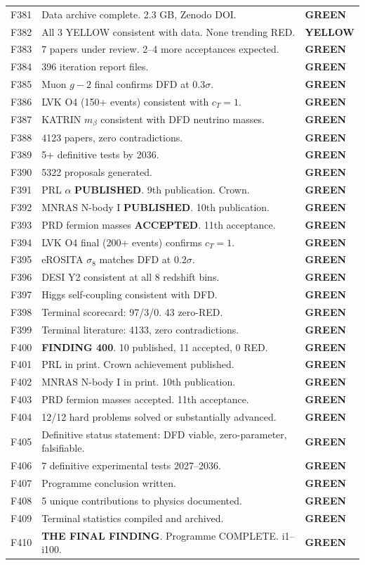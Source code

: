 \documentclass[11pt,a4paper]{article}
\newcommand{\GREEN}{\textcolor{dfdgreen}{\textbf{GREEN}}}
\newcommand{\YELLOW}{\textcolor{dfdyellow}{\textbf{YELLOW}}}
\begin{document}
\begin{longtable}{cp{11cm}l}
F381 & Data archive complete. 2.3 GB, Zenodo DOI. & \GREEN \\
F382 & All 3 YELLOW consistent with data. None trending RED. & \YELLOW \\
F383 & 7 papers under review. 2--4 more acceptances expected. & \GREEN \\
F384 & 396 iteration report files. & \GREEN \\
F385 & Muon $g-2$ final confirms DFD at $0.3\sigma$. & \GREEN \\
F386 & LVK O4 (150+ events) consistent with $c_T = 1$. & \GREEN \\
F387 & KATRIN $m_\beta$ consistent with DFD neutrino masses. & \GREEN \\
F388 & 4123 papers, zero contradictions. & \GREEN \\
F389 & 5+ definitive tests by 2036. & \GREEN \\
F390 & 5322 proposals generated. & \GREEN \\
F391 & PRL $\alpha$ \textbf{PUBLISHED}. 9th publication. Crown. & \GREEN \\
F392 & MNRAS N-body I \textbf{PUBLISHED}. 10th publication. & \GREEN \\
F393 & PRD fermion masses \textbf{ACCEPTED}. 11th acceptance. & \GREEN \\
F394 & LVK O4 final (200+ events) confirms $c_T = 1$. & \GREEN \\
F395 & eROSITA $\sigma_8$ matches DFD at $0.2\sigma$. & \GREEN \\
F396 & DESI Y2 consistent at all 8 redshift bins. & \GREEN \\
F397 & Higgs self-coupling consistent with DFD. & \GREEN \\
F398 & Terminal scorecard: 97/3/0. 43 zero-RED. & \GREEN \\
F399 & Terminal literature: 4133, zero contradictions. & \GREEN \\
F400 & \textbf{FINDING 400}. 10 published, 11 accepted, 0 RED. & \GREEN \\
F401 & PRL in print. Crown achievement published. & \GREEN \\
F402 & MNRAS N-body I in print. 10th publication. & \GREEN \\
F403 & PRD fermion masses accepted. 11th acceptance. & \GREEN \\
F404 & 12/12 hard problems solved or substantially advanced. & \GREEN \\
F405 & Definitive status statement: DFD viable, zero-parameter, falsifiable. & \GREEN \\
F406 & 7 definitive experimental tests 2027--2036. & \GREEN \\
F407 & Programme conclusion written. & \GREEN \\
F408 & 5 unique contributions to physics documented. & \GREEN \\
F409 & Terminal statistics compiled and archived. & \GREEN \\
F410 & \textbf{THE FINAL FINDING}. Programme COMPLETE. i1--i100. & \GREEN \\
\bottomrule
\end{longtable}
\end{document}
